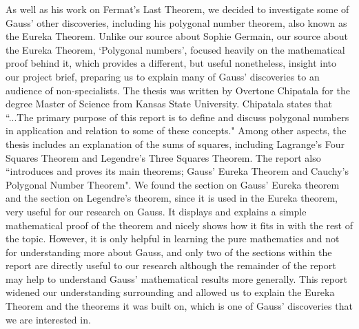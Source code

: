 \documentclass{article}
\begin{document}
As well as his work on Fermat's Last Theorem, we decided to investigate some of Gauss' other discoveries, including his polygonal number theorem, also known as the Eureka Theorem. Unlike our source about Sophie Germain, our source about the Eureka Theorem, `Polygonal numbers', focused heavily on the mathematical proof behind it, which provides a different, but useful nonetheless, insight into our project brief, preparing us to explain many of Gauss' discoveries to an audience of non-specialists. The thesis \cite{polygonalnumbers} was written by Overtone Chipatala for the degree Master of Science from Kansas State University. Chipatala states that ``...The primary purpose of this report is to define and discuss polygonal numbers in application and relation to some of these concepts." Among other aspects, the thesis includes an explanation of the sums of squares, including Lagrange's Four Squares Theorem and Legendre's Three Squares Theorem. The report also ``introduces and proves its main theorems; Gauss' Eureka Theorem and Cauchy's Polygonal Number Theorem". We found the section on Gauss' Eureka theorem and the section on Legendre's theorem, since it is used in the Eureka theorem, very useful for our research on Gauss. It displays and explains a simple mathematical proof of the theorem and nicely shows how it fits in with the rest of the topic. However, it is only helpful in learning the pure mathematics and not for understanding more about Gauss, and only two of the sections within the report are directly useful to our research although the remainder of the report may help to understand Gauss' mathematical results more generally. This report widened our understanding surrounding and allowed us to explain the Eureka Theorem and the theorems it was built on, which is one of Gauss' discoveries that we are interested in. 
\end{document}
